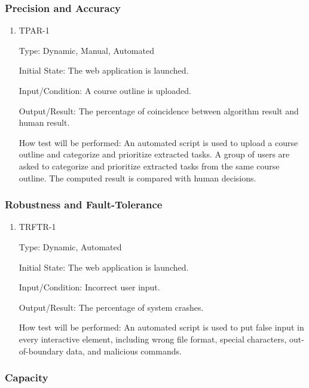 \documentclass[12pt, titlepage]{article}
\begin{document}
\subsubsection{Precision and Accuracy}

\begin{enumerate}
\item{TPAR-1\\}

Type: Dynamic, Manual, Automated
					
Initial State: The web application is launched.
					
Input/Condition: A course outline is uploaded.
					
Output/Result: The percentage of coincidence between algorithm result and human result.
					
How test will be performed: An automated script is used to upload a course outline and categorize and prioritize extracted tasks. A group of users are asked to categorize and prioritize extracted tasks from the same course outline.  The computed result is compared with human decisions.

\end{enumerate}

\subsubsection{Robustness and Fault-Tolerance}

\begin{enumerate}
\item{TRFTR-1\\}

Type: Dynamic, Automated
					
Initial State: The web application is launched.
					
Input/Condition: Incorrect user input.
					
Output/Result: The percentage of system crashes.
					
How test will be performed: An automated script is used to put false input in every interactive element, including wrong file format, special characters, out-of-boundary data, and malicious commands.
\end{enumerate}
\subsubsection{Capacity}
\end{document}
